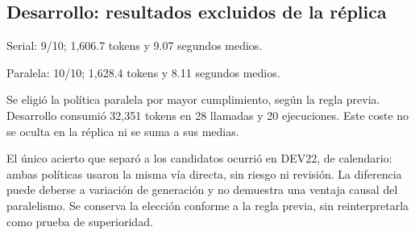 \subsection{Desarrollo: resultados excluidos de la réplica}

Serial: 9/10; 1,606.7 tokens y 9.07 segundos medios.

Paralela: 10/10; 1,628.4 tokens y 8.11 segundos medios.

Se eligió la política paralela por mayor cumplimiento, según la regla previa. Desarrollo consumió 32,351 tokens en 28 llamadas y 20 ejecuciones. Este coste no se oculta en la réplica ni se suma a sus medias.

El único acierto que separó a los candidatos ocurrió en DEV22, de calendario: ambas políticas usaron la misma vía directa, sin riesgo ni revisión. La diferencia puede deberse a variación de generación y no demuestra una ventaja causal del paralelismo. Se conserva la elección conforme a la regla previa, sin reinterpretarla como prueba de superioridad.
